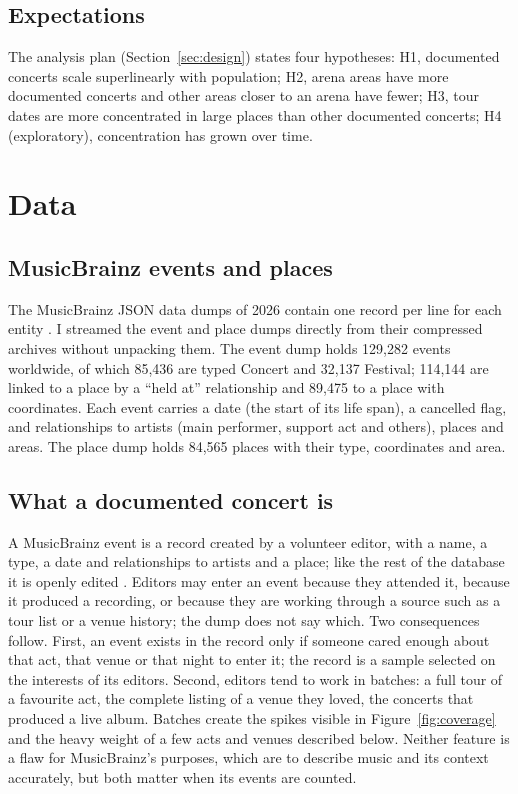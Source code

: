 \documentclass[11pt,a4paper]{article}
\begin{document}
\subsection{Expectations}
The analysis plan (Section~\ref{sec:design}) states four hypotheses: H1, documented concerts scale superlinearly with population; H2, arena areas have more documented concerts and other areas closer to an arena have fewer; H3, tour dates are more concentrated in large places than other documented concerts; H4 (exploratory), concentration has grown over time.

\section{Data}\label{sec:data}
\subsection{MusicBrainz events and places}
The MusicBrainz JSON data dumps of 2026 contain one record per line for each entity \citep{metabrainz2026}. I streamed the event and place dumps directly from their compressed archives without unpacking them. The event dump holds 129,282 events worldwide, of which 85,436 are typed Concert and 32,137 Festival; 114,144 are linked to a place by a ``held at'' relationship and 89,475 to a place with coordinates. Each event carries a date (the start of its life span), a cancelled flag, and relationships to artists (main performer, support act and others), places and areas. The place dump holds 84,565 places with their type, coordinates and area.

\subsection{What a documented concert is}
A MusicBrainz event is a record created by a volunteer editor, with a name, a type, a date and relationships to artists and a place; like the rest of the database it is openly edited \citep{swartz2002,metabrainz2026}. Editors may enter an event because they attended it, because it produced a recording, or because they are working through a source such as a tour list or a venue history; the dump does not say which. Two consequences follow. First, an event exists in the record only if someone cared enough about that act, that venue or that night to enter it; the record is a sample selected on the interests of its editors. Second, editors tend to work in batches: a full tour of a favourite act, the complete listing of a venue they loved, the concerts that produced a live album. Batches create the spikes visible in Figure~\ref{fig:coverage} and the heavy weight of a few acts and venues described below. Neither feature is a flaw for MusicBrainz's purposes, which are to describe music and its context accurately, but both matter when its events are counted.
\end{document}
